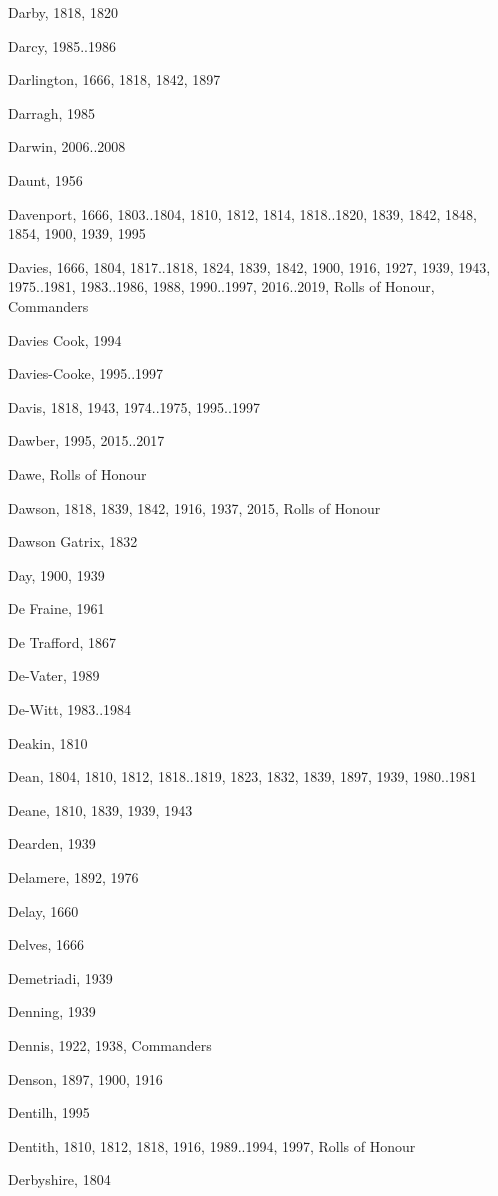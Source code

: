 \begin{theindex}
\item Darby, 1818, 1820
\item Darcy, 1985..1986
\item Darlington, 1666, 1818, 1842, 1897
\item Darragh, 1985
\item Darwin, 2006..2008
\item Daunt, 1956
\item Davenport, 1666, 1803..1804, 1810, 1812, 1814, 1818..1820, 1839, 1842, 1848, 1854, 1900, 1939, 1995
\item Davies, 1666, 1804, 1817..1818, 1824, 1839, 1842, 1900, 1916, 1927, 1939, 1943, 1975..1981, 1983..1986, 1988, 1990..1997, 2016..2019, Rolls of Honour, Commanders
\item Davies Cook, 1994
\item Davies-Cooke, 1995..1997
\item Davis, 1818, 1943, 1974..1975, 1995..1997
\item Dawber, 1995, 2015..2017
\item Dawe, Rolls of Honour
\item Dawson, 1818, 1839, 1842, 1916, 1937, 2015, Rolls of Honour
\item Dawson Gatrix, 1832
\item Day, 1900, 1939
\item De Fraine, 1961
\item De Trafford, 1867
\item De-Vater, 1989
\item De-Witt, 1983..1984
\item Deakin, 1810
\item Dean, 1804, 1810, 1812, 1818..1819, 1823, 1832, 1839, 1897, 1939, 1980..1981
\item Deane, 1810, 1839, 1939, 1943
\item Dearden, 1939
\item Delamere, 1892, 1976
\item Delay, 1660
\item Delves, 1666
\item Demetriadi, 1939
\item Denning, 1939
\item Dennis, 1922, 1938, Commanders
\item Denson, 1897, 1900, 1916
\item Dentilh, 1995
\item Dentith, 1810, 1812, 1818, 1916, 1989..1994, 1997, Rolls of Honour
\item Derbyshire, 1804

\end{theindex}
